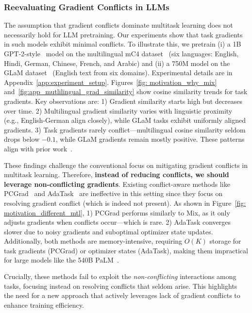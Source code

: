 \subsubsection{Reevaluating Gradient Conflicts in LLMs}  
The assumption that gradient conflicts dominate multitask learning does not necessarily hold for LLM pretraining. Our experiments show that task gradients in such models exhibit minimal conflicts.  
To illustrate this, we pretrain (i) a 1B GPT-2-style~\citep{radford2019language} model on the multilingual mC4 dataset~\citep{xue2020mt5} (six languages: English, Hindi, German, Chinese, French, and Arabic) and (ii) a 750M model on the GLaM dataset~\citep{du2022glam} (English text from six domains). Experimental details are in Appendix~\ref{app:experiment_setup}. Figures~\ref{fig: motivation_why_mix} and~\ref{fig:app_mutlilingual_grad_similarity} show cosine similarity trends for task gradients. Key observations are:  1) Gradient similarity starts high but decreases over time. 2) Multilingual gradient similarity varies with linguistic proximity (e.g., English-German align closely), while GLaM tasks exhibit uniformly aligned gradients.  
3) Task gradients rarely conflict—multilingual cosine similarity seldom drops below $-0.1$, while GLaM gradients remain mostly positive. These patterns align with prior work~\citep{wang2020gradient}.  


These findings challenge the conventional focus on mitigating gradient conflicts in multitask learning. Therefore, \textbf{instead of reducing conflicts, we should leverage non-conflicting gradients}.  
Existing conflict-aware methods like PCGrad~\citep{yu2020gradient} and AdaTask~\citep{yang2023adatask} are ineffective in this setting since they focus on resolving gradient conflict (which is indeed not present). As shown in Figure~\ref{fig: motivation_different_mtl}, 1) PCGrad performs similarly to Mix, as it only adjusts gradients when conflicts occur—which is rare.  2) AdaTask converges slower due to noisy gradients and suboptimal optimizer state updates. Additionally, both methods are memory-intensive, requiring \(O(K)\) storage for task gradients (PCGrad) or optimizer states (AdaTask), making them impractical for large models like the 540B PaLM~\citep{chowdhery2022palm}.  

Crucially, these methods fail to exploit the \textit{non-conflicting} interactions among tasks, focusing instead on resolving conflicts that seldom arise. This highlights the need for a new approach that actively leverages lack of gradient conflicts to enhance training efficiency.




